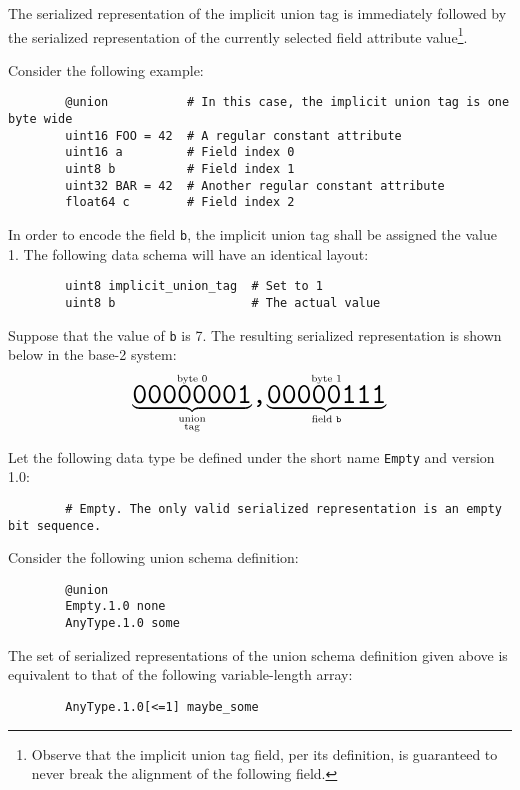 The serialized representation of the implicit union tag is immediately followed by
the serialized representation of the currently selected field attribute value\footnote{%
    Observe that the implicit union tag field, per its definition,
    is guaranteed to never break the alignment of the following field.
}.

\begin{remark}
    Consider the following example:

    \begin{verbatim}
        @union           # In this case, the implicit union tag is one byte wide
        uint16 FOO = 42  # A regular constant attribute
        uint16 a         # Field index 0
        uint8 b          # Field index 1
        uint32 BAR = 42  # Another regular constant attribute
        float64 c        # Field index 2
    \end{verbatim}

    In order to encode the field \verb|b|, the implicit union tag shall be assigned the value 1.
    The following data schema will have an identical layout:

    \begin{verbatim}
        uint8 implicit_union_tag  # Set to 1
        uint8 b                   # The actual value
    \end{verbatim}

    Suppose that the value of \verb|b| is 7.
    The resulting serialized representation is shown below in the base-2 system:
    $$%
    \overset{\text{byte 0}}{%
        \underbrace{\hugett{00000001}}_{\substack{\text{union} \\ \text{tag}}}%
    }%
    \hugett{,}%
    \overset{\text{byte 1}}{%
        \underbrace{\hugett{00000111}}_{\text{field }\texttt{b}}%
    }
    $$

\end{remark}

\begin{remark}
    Let the following data type be defined under the short name \verb|Empty| and version 1.0:

    \begin{verbatim}
        # Empty. The only valid serialized representation is an empty bit sequence.
    \end{verbatim}

    Consider the following union schema definition:

    \begin{verbatim}
        @union
        Empty.1.0 none
        AnyType.1.0 some
    \end{verbatim}

    The set of serialized representations of the union schema definition given above is equivalent to
    that of the following variable-length array:

    \begin{verbatim}
        AnyType.1.0[<=1] maybe_some
    \end{verbatim}
\end{remark}
